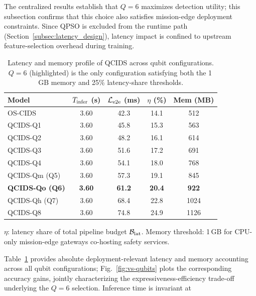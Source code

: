 \documentclass[conference]{IEEEtran}
\begin{document}
The centralized results establish that $Q{=}6$ maximizes
detection utility; this subsection confirms that this choice
also satisfies mission-edge deployment constraints. Since QPSO
is excluded from the runtime path (Section~\ref{subsec:latency_design}),
latency impact is confined to upstream feature-selection overhead during training.
\begin{table}[!t]
\centering
\caption{\scriptsize{Latency and memory profile of QCIDS across qubit
configurations. 
$Q{=}6$ (highlighted) is the only configuration satisfying
both the 1\,GB memory and 25\% latency-share thresholds.}}
\label{tab:latency_profile_qcids}
\renewcommand{\arraystretch}{1.10}
\setlength{\tabcolsep}{5pt}
\begin{tabular}{lcccc}
\hline\toprule
\textbf{Model} & \textbf{$T_{\rm infer}$ (s)}
& \textbf{$\mathcal{L}_{\rm e2e}$ (ms)}
& \textbf{$\eta$ (\%)}
& \textbf{Mem (MB)} \\
\hline\toprule
OS-CIDS        & 3.60 & 42.3 & 14.1 &  512 \\
QCIDS-Q1       & 3.60 & 45.8 & 15.3 &  563 \\
QCIDS-Q2       & 3.60 & 48.2 & 16.1 &  614 \\
QCIDS-Q3       & 3.60 & 51.6 & 17.2 &  691 \\
QCIDS-Q4       & 3.60 & 54.1 & 18.0 &  768 \\
QCIDS-Qm (Q5)  & 3.60 & 57.3 & 19.1 &  845 \\
\rowcolor{gray!12}
\textbf{QCIDS-Qo (Q6)}
               & \textbf{3.60} & \textbf{61.2}
               & \textbf{20.4} & \textbf{922} \\
QCIDS-Qh (Q7)  & 3.60 & 68.4 & 22.8 & 1024 \\
QCIDS-Q8       & 3.60 & 74.8 & 24.9 & 1126 \\
\hline\toprule
\end{tabular}
\begin{minipage}{\columnwidth}
\vspace{2pt}
\footnotesize{$\eta$: latency share of total pipeline
budget $\mathcal{B}_{\rm lat}$. Memory threshold: 1\,GB
for CPU-only mission-edge gateways co-hosting safety
services.}
\end{minipage}
\end{table}
Table~\ref{tab:latency_profile_qcids} provides absolute
deployment-relevant latency and memory accounting across
all qubit configurations; Fig.~\ref{fig:vs-qubits} plots
the corresponding accuracy gains, jointly characterizing
the expressiveness-efficiency trade-off underlying the
$Q{=}6$ selection. Inference time is invariant at
\end{document}
